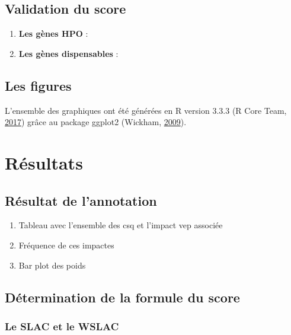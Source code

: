 \documentclass[12pt,twoside]{reedthesis}
\providecommand{\tightlist}{%
  \setlength{\itemsep}{0pt}\setlength{\parskip}{0pt}}
\theoremstyle{definition}
\theoremstyle{definition}
\theoremstyle{remark}
\begin{document}
  \subsection{Validation du score}\label{validation-du-score}
  
  \begin{enumerate}
  \def\labelenumi{\arabic{enumi}.}
  \tightlist
  \item
    \textbf{Les gènes HPO} :\\
  \item
    \textbf{Les gènes dispensables} :
  \end{enumerate}
  
  \subsection{Les figures}\label{les-figures}
  
  L'ensemble des graphiques ont été générées en R version 3.3.3 (R Core
  Team, \protect\hyperlink{ref-RCoreTeam2017}{2017}) grâce au package
  ggplot2 (Wickham, \protect\hyperlink{ref-Wickham2009}{2009}).
  
  \section{Résultats}\label{resultats-2}
  
  \subsection{Résultat de l'annotation}\label{resultat-de-lannotation}
  
  \begin{enumerate}
  \def\labelenumi{\arabic{enumi}.}
  \item
    Tableau avec l'ensemble des csq et l'impact vep associée
  \item
    Fréquence de ces impactes\\
  \item
    Bar plot des poids
  \end{enumerate}
  
  \subsection{Détermination de la formule du
  score}\label{determination-de-la-formule-du-score}
  
  \subsubsection{Le SLAC et le WSLAC}\label{le-slac-et-le-wslac}
  
\end{document}
